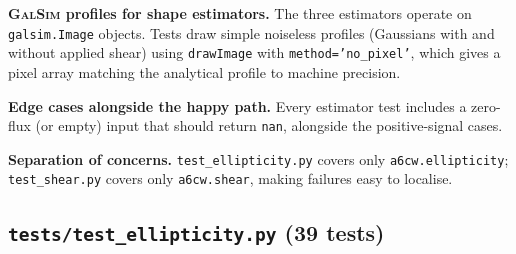 \textbf{\textsc{GalSim} profiles for shape estimators.} The three estimators
operate on \texttt{galsim.Image} objects. Tests draw simple noiseless profiles
(Gaussians with and without applied shear) using \texttt{drawImage} with
\texttt{method='no\_pixel'}, which gives a pixel array matching the analytical
profile to machine precision.

\textbf{Edge cases alongside the happy path.} Every estimator test includes a
zero-flux (or empty) input that should return \texttt{nan}, alongside the
positive-signal cases.

\textbf{Separation of concerns.} \texttt{test\_ellipticity.py} covers only
\texttt{a6cw.ellipticity}; \texttt{test\_shear.py} covers only
\texttt{a6cw.shear}, making failures easy to localise.

\subsection{\texttt{tests/test\_ellipticity.py} (39 tests)}

